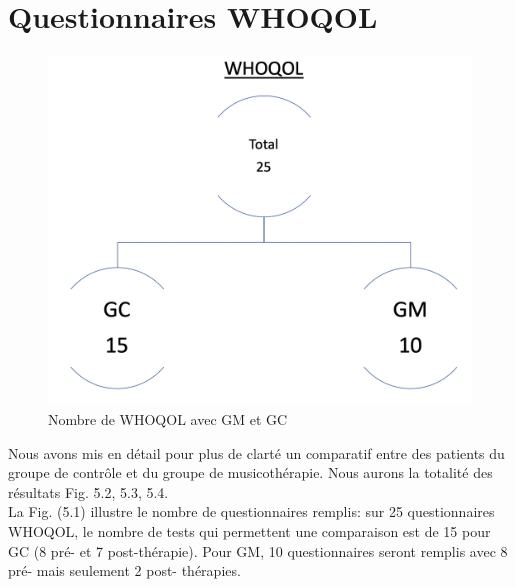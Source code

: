        \section{Questionnaires WHOQOL}
   \begin{figure}[th]
   	\centering
   	\includegraphics[width=0.7\linewidth]{images/TestWQ.png}
   	\caption[Nombre de WHOQOL avec GM et GC]{Nombre de WHOQOL avec GM et GC}
   \end{figure}
   Nous avons mis en détail pour plus de clarté un comparatif entre des patients du 
   groupe de contrôle et du groupe de 
   musicothérapie.  %
    Nous aurons la 
   totalité des 
   résultats Fig. 5.2, 5.3, 5.4.
   	\\
    La Fig. (5.1) illustre le nombre  de questionnaires 
   remplis: sur 25 questionnaires WHOQOL, %
   le nombre de tests qui permettent une comparaison est de  15 pour GC (8 pré-
   et 7 post-thérapie).
   Pour GM, 10 questionnaires seront  remplis
   avec 8  pré- mais seulement 2
   post- thérapies.
   
